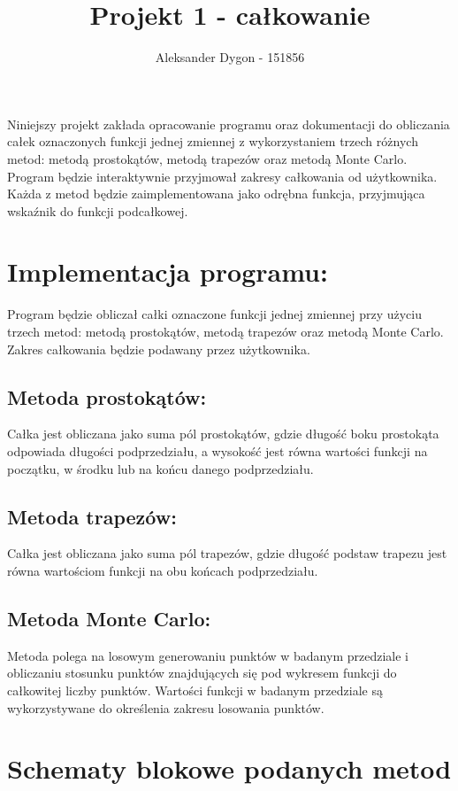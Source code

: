 \documentclass{article}
\title{Projekt 1 - całkowanie}
\author{Aleksander Dygon - 151856}
\date{}
\begin{document}
\maketitle

Niniejszy projekt zakłada opracowanie programu oraz dokumentacji do obliczania całek oznaczonych funkcji jednej zmiennej z wykorzystaniem trzech różnych metod: metodą prostokątów, metodą trapezów oraz metodą Monte Carlo. Program będzie interaktywnie przyjmował zakresy całkowania od użytkownika. Każda z metod będzie zaimplementowana jako odrębna funkcja, przyjmująca wskaźnik do funkcji podcałkowej.

\section*{Implementacja programu:}
Program będzie obliczał całki oznaczone funkcji jednej zmiennej przy użyciu trzech metod: metodą prostokątów, metodą trapezów oraz metodą Monte Carlo. Zakres całkowania będzie podawany przez użytkownika.

\subsection*{Metoda prostokątów:}
Całka jest obliczana jako suma pól prostokątów, gdzie długość boku prostokąta odpowiada długości podprzedziału, a wysokość jest równa wartości funkcji na początku, w środku lub na końcu danego podprzedziału.

\subsection*{Metoda trapezów:}
Całka jest obliczana jako suma pól trapezów, gdzie długość podstaw trapezu jest równa wartościom funkcji na obu końcach podprzedziału.

\subsection*{Metoda Monte Carlo:}
Metoda polega na losowym generowaniu punktów w badanym przedziale i obliczaniu stosunku punktów znajdujących się pod wykresem funkcji do całkowitej liczby punktów. Wartości funkcji w badanym przedziale są wykorzystywane do określenia zakresu losowania punktów.

\section*{Schematy blokowe podanych metod}
\end{document}
